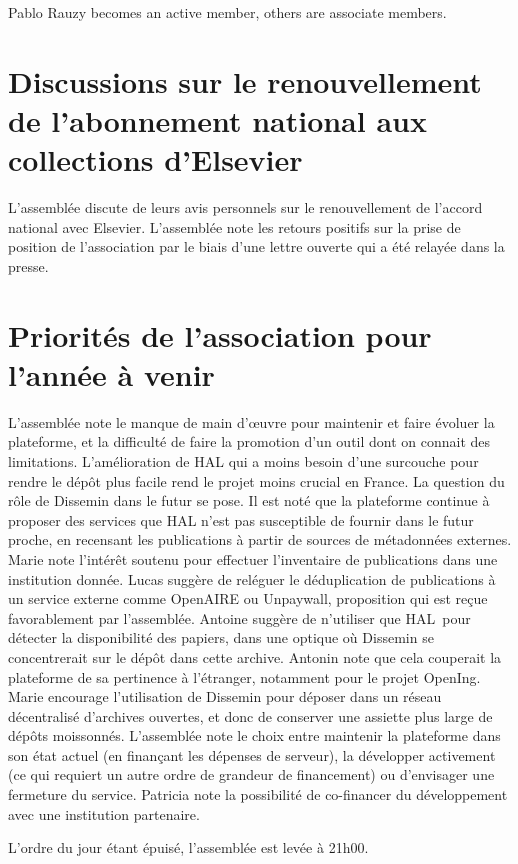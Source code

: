 \documentclass[a4paper]{article}
\begin{document}
Pablo Rauzy becomes an active member, others are associate members.
  
\section{Discussions sur le renouvellement de l'abonnement national aux collections d'Elsevier}

L'assemblée discute de leurs avis personnels sur le renouvellement de l'accord national avec Elsevier. L'assemblée note les retours positifs sur la prise de position de l'association par le biais d'une lettre ouverte qui a été relayée dans la presse.

\section{Priorités de l'association pour l'année à venir}

L'assemblée note le manque de main d'œuvre pour maintenir et faire évoluer la plateforme,
et la difficulté de faire la promotion d'un outil dont on connait des limitations.
L'amélioration de HAL qui a moins besoin d'une surcouche pour rendre le dépôt plus facile
rend le projet moins crucial en France. La question du rôle de Dissemin dans le futur se pose. Il est noté que la plateforme continue à proposer des services que HAL n'est pas susceptible de fournir dans le futur proche, en recensant les publications à
partir de sources de métadonnées externes.
Marie note l'intérêt soutenu pour effectuer l'inventaire de publications dans une institution donnée.
Lucas suggère de reléguer le déduplication de publications à un service externe comme OpenAIRE ou Unpaywall, proposition qui est reçue favorablement par l'assemblée.
Antoine suggère de n'utiliser que HAL pour détecter la disponibilité des papiers, dans une optique où Dissemin se concentrerait sur le dépôt dans cette archive. Antonin note que cela couperait la plateforme de sa pertinence à l'étranger, notamment pour le
projet OpenIng.
Marie encourage l'utilisation de Dissemin pour déposer dans un réseau décentralisé d'archives ouvertes, et donc de conserver une assiette plus large de dépôts moissonnés.
L'assemblée note le choix entre maintenir la plateforme dans son état actuel (en finançant les dépenses de serveur), la développer activement (ce qui requiert un autre ordre de grandeur de financement) ou d'envisager une fermeture du service. Patricia note
la possibilité de co-financer du développement avec une institution partenaire.

L'ordre du jour étant épuisé, l'assemblée est levée à 21h00.
\end{document}
